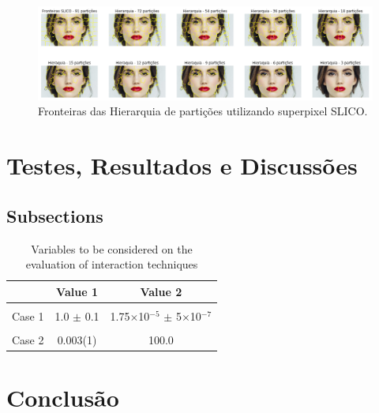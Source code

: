 \begin{document}
\begin{figure}[ht]
\centering
\includegraphics[width=1.\textwidth]{slic_hierarquia_particoes.png}
\caption{Fronteiras das Hierarquia de partições utilizando superpixel SLICO.}
\label{alg:SLIC}
\end{figure}


\section{Testes, Resultados e Discussões} \label{sec:testes}


\subsection{Subsections}


\begin{table}[ht]
\centering
\caption{Variables to be considered on the evaluation of interaction
  techniques}
\label{tab:exTable1}
\smallskip
\begin{tabular}{|l|c|c|}
\hline
& Value 1 & Value 2\\[0.5ex]
\hline
&&\\[-2ex]
Case 1 & 1.0 $\pm$ 0.1 & 1.75$\times$10$^{-5}$ $\pm$ 5$\times$10$^{-7}$\\[0.5ex]
\hline
&&\\[-2ex]
Case 2 & 0.003(1) & 100.0\\[0.5ex]
\hline
\end{tabular}
\end{table}


\section{Conclusão} \label{sec:conclusao}




\end{document}
